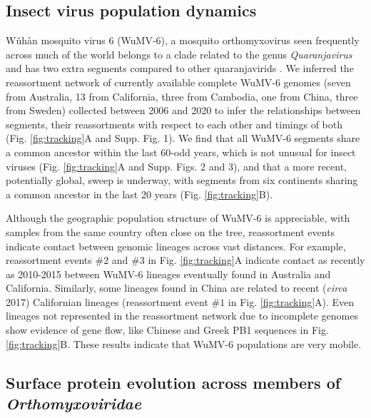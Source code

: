 \documentclass[11pt,twocolumn]{article}
\begin{document}
\subsection{Insect virus population dynamics}

W\v{u}h\`{a}n mosquito virus 6 (WuMV-6), a mosquito orthomyxovirus seen frequently across much of the world \citep{pettersson_meta-transcriptomic_2019,li_unprecedented_2015,shi_high-resolution_2017} belongs to a clade related to the genus \textit{Quaranjavirus} and has two extra segments compared to other quaranjavirids \citep{batson_single_2021}.
We inferred the reassortment network \citep{muller_bayesian_2020} of currently available complete WuMV-6 genomes (seven from Australia, 13 from California, three from Cambodia, one from China, three from Sweden) collected between 2006 and 2020 to infer the relationships between segments, their reassortments with respect to each other and timings of both (Fig. \ref{fig:tracking}A and Supp. Fig. 1).
We find that all WuMV-6 segments share a common ancestor within the last 60-odd years, which is not unusual for insect viruses \citep{webster_discovery_2015} (Fig. \ref{fig:tracking}A and Supp. Figs. 2 and 3), and that a more recent, potentially global, sweep is underway, with segments from six continents sharing a common ancestor in the last 20 years (Fig. \ref{fig:tracking}B).



Although the geographic population structure of WuMV-6 is appreciable, with samples from the same country often close on the tree, reassortment events indicate contact between genomic lineages across vast distances.
For example, reassortment events $\#2$ and $\#3$ in Fig. \ref{fig:tracking}A indicate contact as recently as 2010-2015 between WuMV-6 lineages eventually found in Australia and California.
Similarly, some lineages found in China are related to recent (\textit{circa} 2017) Californian lineages (reassortment event $\#1$ in Fig. \ref{fig:tracking}A).
Even lineages not represented in the reassortment network due to incomplete genomes show evidence of gene flow, like Chinese and Greek PB1 sequences in Fig. \ref{fig:tracking}B.
These results indicate that WuMV-6 populations are very mobile.



\subsection{Surface protein evolution across members of \textit{Orthomyxoviridae}}
\end{document}
